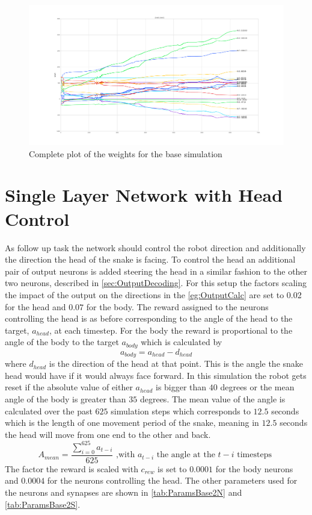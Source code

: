 \begin{figure}[htpb]
  \centering
  \includegraphics[width=\textwidth]{figures/plots/WBase1}
  \caption{ Complete plot of the weights for the base simulation }
  \label{fig:WBase1}
\end{figure}

\section{Single Layer Network with Head Control}
As follow up task the network should control the robot direction and additionally the direction the head of the snake is facing. To control the head an additional pair of output neurons is added steering the head in a similar fashion to the other two neurons, described in \autoref{sec:OutputDecoding}. For this setup the factors scaling the impact of the output on the directions in the \autoref{eg:OutputCalc} are set to 0.02 for the head and $0.07$ for the body.
The reward assigned to the neurons controlling the head is as before corresponding to the angle of the head to the target, $a_{head}$, at each timestep. For the body the reward is proportional to the angle of the body to the target $a_{body}$ which is calculated by
\begin{equation} \label{eq:bodyAngle}
a_{body} = a_{head} - d_{head}
\end{equation}
where $d_{head}$ is the direction of the head at that point. This is the angle the snake head would have if it would always face forward.
In this simulation the robot gets reset if the absolute value of either $a_{head}$ is bigger than $40$ degrees or the mean angle of the body is greater than $35$ degrees.
The mean value of the angle is calculated over the past $625$ simulation steps which corresponds to $12.5$ seconds which is the length of one movement period of the snake, meaning in $12.5$ seconds the head will move from one end to the other and back. 
\begin{equation}
A_{mean} = \frac { \sum_{i=0}^{625} a_{t-i} } {625} \text{ ,with $a_{t-i}$ the angle at the $t-i$ timesteps }
\end{equation}
The factor the reward is scaled with $c_{rew}$ is set to $0.0001$ for the body neurons and $0.0004$ for the neurons controlling the head. The other parameters used for the neurons and synapses are shown in \autoref{tab:ParamsBase2N} and \autoref{tab:ParamsBase2S}.

